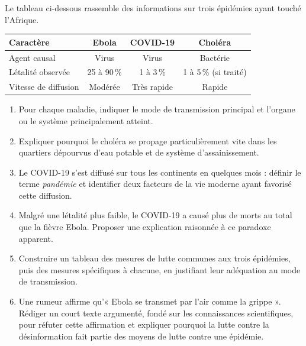 \documentclass[11pt]{article}
\begin{document}
\begin{exercice}
Le tableau ci-dessous rassemble des informations sur trois épidémies ayant touché l'Afrique.
\begin{center}
\begin{tabular}{|l|c|c|c|}
\hline
\textbf{Caractère} & \textbf{Ebola} & \textbf{COVID-19} & \textbf{Choléra} \\
\hline
Agent causal & Virus & Virus & Bactérie \\
\hline
Létalité observée & 25 à 90\,\% & 1 à 3\,\% & 1 à 5\,\% (si traité) \\
\hline
Vitesse de diffusion & Modérée & Très rapide & Rapide \\
\hline
\hline
\end{tabular}
\end{center}
\begin{enumerate}
\item Pour chaque maladie, indiquer le mode de transmission principal et l'organe ou le système principalement atteint.
\item Expliquer pourquoi le choléra se propage particulièrement vite dans les quartiers dépourvus d'eau potable et de système d'assainissement.
\item Le COVID-19 s'est diffusé sur tous les continents en quelques mois : définir le terme \emph{pandémie} et identifier deux facteurs de la vie moderne ayant favorisé cette diffusion.
\item Malgré une létalité plus faible, le COVID-19 a causé plus de morts au total que la fièvre Ebola. Proposer une explication raisonnée à ce paradoxe apparent.
\item Construire un tableau des mesures de lutte communes aux trois épidémies, puis des mesures spécifiques à chacune, en justifiant leur adéquation au mode de transmission.
\item Une rumeur affirme qu'« Ebola se transmet par l'air comme la grippe ». Rédiger un court texte argumenté, fondé sur les connaissances scientifiques, pour réfuter cette affirmation et expliquer pourquoi la lutte contre la désinformation fait partie des moyens de lutte contre une épidémie.
\end{enumerate}
\end{exercice}
\end{document}
